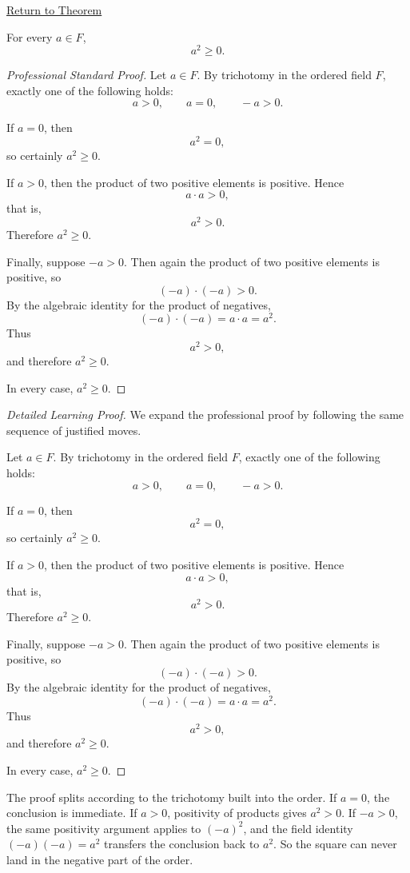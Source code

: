 \newpage
{}
\label{prf:squares-nonnegative}

\begin{remark*}[Return]
\hyperref[thm:squares-nonnegative]{Return to Theorem}
\end{remark*}

\begin{theorem*}
For every $a\in F$,
\[
a^2\ge 0.
\]
\end{theorem*}

\begin{proof}[Professional Standard Proof]
\LRAProofBodyStart
Let $a\in F$.  By trichotomy in the ordered field $F$, exactly one of the
following holds:
\[
a>0,\qquad a=0,\qquad -a>0.
\]

If $a=0$, then
\[
a^2=0,
\]
so certainly $a^2\ge 0$.

If $a>0$, then the product of two positive elements is positive.  Hence
\[
a\cdot a>0,
\]
that is,
\[
a^2>0.
\]
Therefore $a^2\ge 0$.

Finally, suppose $-a>0$.  Then again the product of two positive elements is
positive, so
\[
(-a)\cdot(-a)>0.
\]
By the algebraic identity for the product of negatives,
\[
(-a)\cdot(-a)=a\cdot a=a^2.
\]
Thus
\[
a^2>0,
\]
and therefore $a^2\ge 0$.

In every case, $a^2\ge 0$.
\end{proof}

\begin{proof}[Detailed Learning Proof]
\LRAProofBodyStart
We expand the professional proof by following the same sequence of justified moves.

Let $a\in F$.  By trichotomy in the ordered field $F$, exactly one of the
following holds:
\[
a>0,\qquad a=0,\qquad -a>0.
\]

If $a=0$, then
\[
a^2=0,
\]
so certainly $a^2\ge 0$.

If $a>0$, then the product of two positive elements is positive.  Hence
\[
a\cdot a>0,
\]
that is,
\[
a^2>0.
\]
Therefore $a^2\ge 0$.

Finally, suppose $-a>0$.  Then again the product of two positive elements is
positive, so
\[
(-a)\cdot(-a)>0.
\]
By the algebraic identity for the product of negatives,
\[
(-a)\cdot(-a)=a\cdot a=a^2.
\]
Thus
\[
a^2>0,
\]
and therefore $a^2\ge 0$.

In every case, $a^2\ge 0$.
\end{proof}

\begin{remark*}
The proof splits according to the trichotomy built into the order.  If
$a=0$, the conclusion is immediate.  If $a>0$, positivity of products gives
$a^2>0$.  If $-a>0$, the same positivity argument applies to $(-a)^2$, and
the field identity $(-a)(-a)=a^2$ transfers the conclusion back to $a^2$.
So the square can never land in the negative part of the order.
\end{remark*}

